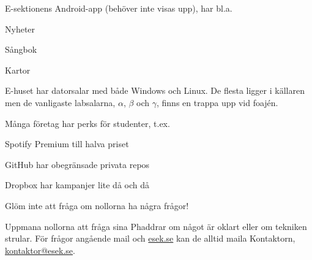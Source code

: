 \documentclass[10pt]{article}
\begin{document}
\begin{dashlist}
		\item E-sektionens Android-app (behöver inte visas upp), har bl.a.
		\begin{dashlist}
			\item Nyheter
			\item Sångbok
			\item Kartor
		\end{dashlist}

		\item E-huset har datorsalar med både Windows och Linux. De flesta ligger i källaren men de vanligaste labsalarna, $\alpha$, $\beta$ och $\gamma$, finns en trappa upp vid foajén.

		\item Många företag har perks för studenter, t.ex.
		\begin{dashlist}
			\item Spotify Premium till halva priset
			\item GitHub har obegränsade privata repos
			\item Dropbox har kampanjer lite då och då
		\end{dashlist}

		\item Glöm inte att fråga om nollorna ha några frågor!

		\item Uppmana nollorna att fråga sina Phaddrar om något är oklart eller om tekniken strular. För frågor angående mail och \url{esek.se} kan de alltid maila Kontaktorn, \url{kontaktor@esek.se}.
	\end{dashlist}
\end{document}
